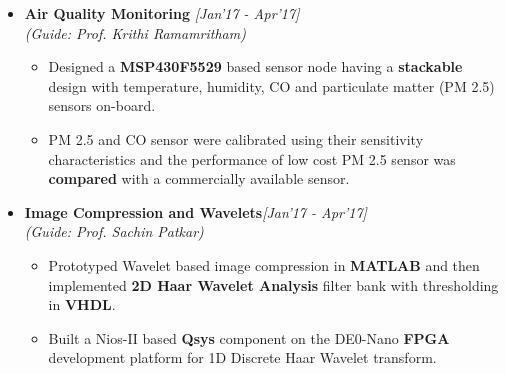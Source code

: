 \documentclass{article}
\begin{document}
\vspace{-2mm}\begin{itemize}[leftmargin=3.5mm]
	\setlength{\itemsep}{-0.29em}
	\item \textbf{Air Quality Monitoring }\hfill{\textit{[Jan'17 - Apr'17]}}
	\\\textit{(Guide: Prof. Krithi Ramamritham)}
	\vspace{-6pt}
	\begin{itemize}[leftmargin=3.5mm]
		\vspace{-0.5mm}
		\setlength{\itemsep}{1mm}
		\item Designed a \textbf{MSP430F5529} based  sensor node having a \textbf{stackable} design with temperature, humidity, CO and particulate matter (PM 2.5) sensors on-board.
		\vspace{-1.5mm}
		\item PM 2.5 and CO sensor were calibrated using their sensitivity characteristics and the performance of low cost PM 2.5 sensor was \textbf{compared} with a commercially available sensor. 
	\end{itemize}
\end{itemize}
\vspace{-5mm}
\begin{itemize}[leftmargin=3.5mm]
	\setlength{\itemsep}{-0.29em}
	\item \textbf{Image Compression and Wavelets}\hspace{2mm}\hfill{\textit{[Jan'17 - Apr'17]}}
	\\\textit{(Guide: Prof. Sachin Patkar)}
	\vspace{-6pt}
	\begin{itemize}[leftmargin=3.5mm]
		\vspace{-0.5mm}
		\setlength{\itemsep}{1mm}
		\item Prototyped Wavelet based image compression in \textbf{MATLAB} and then implemented \textbf{2D Haar Wavelet Analysis} filter bank with thresholding in \textbf{VHDL}.
		\vspace{-1.5mm}
		\item Built a Nios-II based \textbf{Qsys} component on the DE0-Nano \textbf{FPGA} development platform for 1D Discrete Haar  Wavelet transform.
	\end{itemize}
\end{itemize}
\vspace{-5mm}
\end{document}
